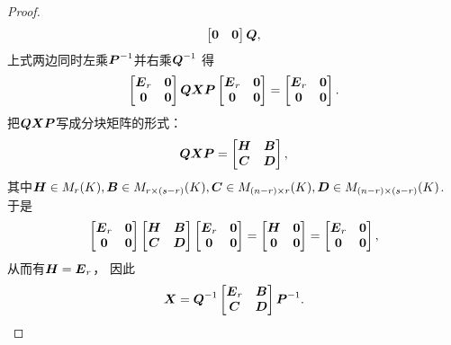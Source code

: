 \begin{theorem}[广义逆存在定理]
\begin{proof}
\begin{equation*}
\begin{bmatrix}
		\boldsymbol0 & \boldsymbol0
	\end{bmatrix}
	\boldsymbol{Q},
\end{equation*}
上式两边同时左乘\(\boldsymbol{P}^{-1}\)并右乘\(\boldsymbol{Q}^{-1}\)
得\begin{equation*}
	\begin{bmatrix}
		\boldsymbol{E}_r & \boldsymbol0 \\
		\boldsymbol0 & \boldsymbol0
	\end{bmatrix}
	\boldsymbol{Q} \boldsymbol{X} \boldsymbol{P}
	\begin{bmatrix}
		\boldsymbol{E}_r & \boldsymbol0 \\
		\boldsymbol0 & \boldsymbol0
	\end{bmatrix}
	=
	\begin{bmatrix}
		\boldsymbol{E}_r & \boldsymbol0 \\
		\boldsymbol0 & \boldsymbol0
	\end{bmatrix}.
\end{equation*}
把\(\boldsymbol{Q} \boldsymbol{X} \boldsymbol{P}\)写成分块矩阵的形式：\begin{equation*}
	\boldsymbol{Q} \boldsymbol{X} \boldsymbol{P}
	= \begin{bmatrix}
		\boldsymbol{H} & \boldsymbol{B} \\
		\boldsymbol{C} & \boldsymbol{D}
	\end{bmatrix},
\end{equation*}
其中\(
	\boldsymbol{H} \in M_r(K),
	\boldsymbol{B} \in M_{r \times (s-r)}(K),
	\boldsymbol{C} \in M_{(n-r) \times r}(K),
	\boldsymbol{D} \in M_{(n-r) \times (s-r)}(K)
\).
于是\begin{equation*}
	\begin{bmatrix}
		\boldsymbol{E}_r & \boldsymbol0 \\
		\boldsymbol0 & \boldsymbol0
	\end{bmatrix}
	\begin{bmatrix}
		\boldsymbol{H} & \boldsymbol{B} \\
		\boldsymbol{C} & \boldsymbol{D}
	\end{bmatrix}
	\begin{bmatrix}
		\boldsymbol{E}_r & \boldsymbol0 \\
		\boldsymbol0 & \boldsymbol0
	\end{bmatrix}
	= \begin{bmatrix}
		\boldsymbol{H} & \boldsymbol0 \\
		\boldsymbol0 & \boldsymbol0
	\end{bmatrix}
	= \begin{bmatrix}
		\boldsymbol{E}_r & \boldsymbol0 \\
		\boldsymbol0 & \boldsymbol0
	\end{bmatrix},
\end{equation*}
从而有\(\boldsymbol{H} = \boldsymbol{E}_r\)，
因此\begin{equation*}
	\boldsymbol{X}
	= \boldsymbol{Q}^{-1}
	\begin{bmatrix}
		\boldsymbol{E}_r & \boldsymbol{B} \\
		\boldsymbol{C} & \boldsymbol{D}
	\end{bmatrix}
	\boldsymbol{P}^{-1}.
\end{equation*}


\end{proof}
\end{theorem}
